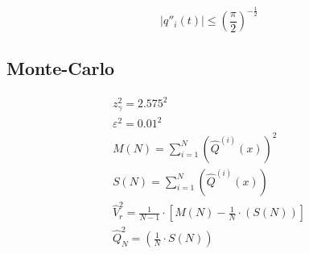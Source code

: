 \begin{equation*}
  \left| q''_i\left( t \right) \right|
  \le \left( \frac{\pi}{2} \right)^{- \frac{1}{2}}
\end{equation*}

\subsection{Monte-Carlo}

\begin{equation*}
  \begin{split}
    z^2_{\gamma} = 2.575^2 \\
    \varepsilon^2 = 0.01^2 \\
    M\left( N \right) = \sum_{i=1}^{N} \left(
        \hat{Q}^{\left( i \right)}\left( x \right)
      \right)^2 \\
      S\left( N \right) = \sum_{i=1}^{N} \left(
      \hat{Q}^{\left( i \right)}\left( x \right)
      \right) \\
    \hat{V}^2_r = \frac{1}{N-1}
      \cdot \left[ M\left( N \right) - \frac{1}{N}
        \cdot \left( S\left( N \right) \right) \right] \\
    \hat{Q}^2_N = \left( \frac{1}{N} \cdot S\left( N \right) \right)
  \end{split}
\end{equation*}
